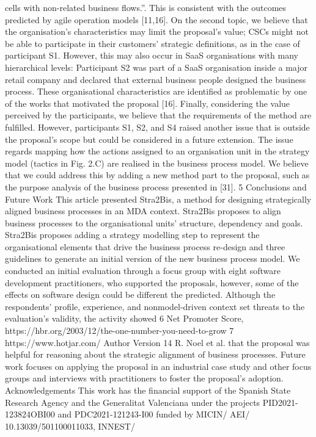 cells with non-related business flows.”. This is consistent with the outcomes predicted by agile operation models [11,16]. On the second topic, we believe that
the organisation’s characteristics may limit the proposal’s value; CSCs might not
be able to participate in their customers’ strategic definitions, as in the case of
participant S1. However, this may also occur in SaaS organisations with many
hierarchical levels: Participant S2 was part of a SaaS organisation inside a major
retail company and declared that external business people designed the business
process. These organisational characteristics are identified as problematic by one
of the works that motivated the proposal [16]. Finally, considering the value perceived by the participants, we believe that the requirements of the method are
fulfilled. However, participants S1, S2, and S4 raised another issue that is outside
the proposal’s scope but could be considered in a future extension. The issue regards mapping how the actions assigned to an organisation unit in the strategy
model (tactics in Fig. 2.C) are realised in the business process model. We believe
that we could address this by adding a new method part to the proposal, such
as the purpose analysis of the business process presented in [31].
5 Conclusions and Future Work
This article presented Stra2Bis, a method for designing strategically aligned business processes in an MDA context. Stra2Bis proposes to align business processes
to the organisational units’ structure, dependency and goals. Stra2Bis proposes
adding a strategy modelling step to represent the organisational elements that
drive the business process re-design and three guidelines to generate an initial
version of the new business process model. We conducted an initial evaluation
through a focus group with eight software development practitioners, who supported the proposals, however, some of the effects on software design could be
different the predicted. Although the respondents’ profile, experience, and nonmodel-driven context set threats to the evaluation’s validity, the activity showed
6 Net Promoter Score, https://hbr.org/2003/12/the-one-number-you-need-to-grow
7 https://www.hotjar.com/
Author Version
14 R. Noel et al.
that the proposal was helpful for reasoning about the strategic alignment of
business processes. Future work focuses on applying the proposal in an industrial case study and other focus groups and interviews with practitioners to foster
the proposal’s adoption.
Acknowledgements This work has the financial support of the Spanish State Research Agency and the Generalitat Valenciana under the projects PID2021-123824OBI00 and PDC2021-121243-I00 funded by MICIN/ AEI/ 10.13039/501100011033, INNEST/
